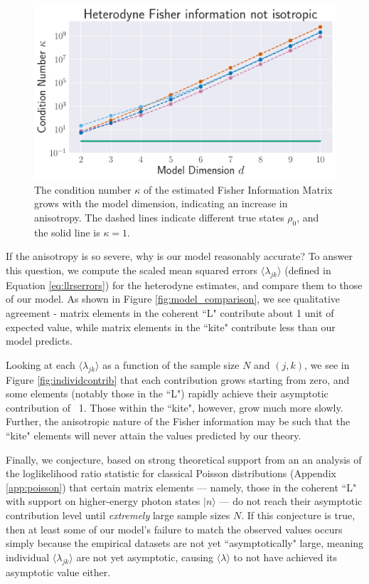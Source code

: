 \documentclass[aps,pra, twocolumn]{revtex4}
\begin{document}
\begin{figure}[h]
  \includegraphics[width=\columnwidth]{Images/Figure_10.pdf}
 \caption{The condition number $\kappa$ of the estimated Fisher Information Matrix grows with the model dimension, indicating an increase in anisotropy. The dashed lines indicate different true states $\rho_{0}$, and the solid line is $\kappa = 1$.}
\label{fig:fish_condition}
\end{figure}

If the anisotropy is so severe, why is our model reasonably accurate? To answer this question, we compute the scaled mean squared errors $\langle \lambda_{jk}\rangle$ (defined in Equation \eqref{eq:llrserrors}) for the heterodyne estimates, and compare them to those of our model. As shown in Figure \ref{fig:model_comparison}, we see qualitative agreement - matrix elements in the coherent ``L" contribute about 1 unit of 
expected value, while matrix elements in the ``kite" contribute less than our model predicts.

Looking at each $\langle \lambda_{jk} \rangle$ as a function of the sample size $N$ and $(j, k)$, we see in Figure \ref{fig:individcontrib} that each contribution grows 
starting from zero, and some elements (notably those in the ``L") rapidly achieve their asymptotic 
contribution of ~1.  Those within the ``kite", however, grow much more slowly. Further, the anisotropic nature of the Fisher information may be such that the ``kite" elements will never attain the values predicted by our theory.

Finally, we conjecture, based on strong theoretical support from an an analysis  of the loglikelihood ratio statistic for classical Poisson distributions (Appendix \ref{app:poisson}) that certain matrix elements --- namely, those in the coherent ``L" with support on higher-energy photon states $|n\rangle$ --- do not reach their asymptotic contribution level until  \emph{extremely} large 
sample sizes $N$.  If this conjecture is true, then at least some of our model's failure to match the observed values occurs 
simply because the empirical datasets are not yet ``asymptotically" large, meaning individual $\langle \lambda_{jk}\rangle$ are not yet asymptotic, causing $\langle \lambda \rangle $ to not have achieved its asymptotic value either.
\end{document}
